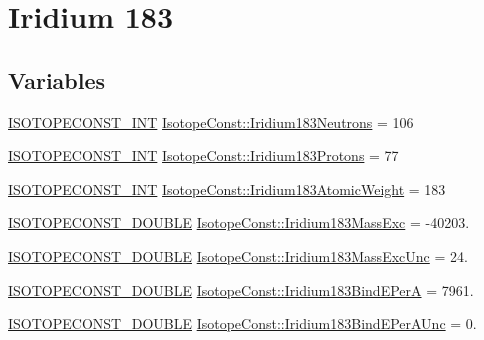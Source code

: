 \hypertarget{group___isotope_const-_iridium-_ir183}{}\section{Iridium 183}
\label{group___isotope_const-_iridium-_ir183}
\subsection*{Variables}
\begin{DoxyCompactItemize}
\item 
\mbox{\hyperlink{group___isotope_const-_macros_ga5f18360b3e99483a35c32d789e62621c}{I\+S\+O\+T\+O\+P\+E\+C\+O\+N\+S\+T\+\_\+\+I\+NT}} \mbox{\hyperlink{group___isotope_const-_iridium-_ir183_gadeab1f71143fd3c436f3b4bcf8632ced}{Isotope\+Const\+::\+Iridium183\+Neutrons}} = 106
\item 
\mbox{\hyperlink{group___isotope_const-_macros_ga5f18360b3e99483a35c32d789e62621c}{I\+S\+O\+T\+O\+P\+E\+C\+O\+N\+S\+T\+\_\+\+I\+NT}} \mbox{\hyperlink{group___isotope_const-_iridium-_ir183_gaadf6c00a1e99c0db1e58bdcf24077c23}{Isotope\+Const\+::\+Iridium183\+Protons}} = 77
\item 
\mbox{\hyperlink{group___isotope_const-_macros_ga5f18360b3e99483a35c32d789e62621c}{I\+S\+O\+T\+O\+P\+E\+C\+O\+N\+S\+T\+\_\+\+I\+NT}} \mbox{\hyperlink{group___isotope_const-_iridium-_ir183_gaf4d8ba202f96002aaa2a75c87951db82}{Isotope\+Const\+::\+Iridium183\+Atomic\+Weight}} = 183
\item 
\mbox{\hyperlink{group___isotope_const-_macros_ga8f45a7272ce02c0b4c65c44636ed719a}{I\+S\+O\+T\+O\+P\+E\+C\+O\+N\+S\+T\+\_\+\+D\+O\+U\+B\+LE}} \mbox{\hyperlink{group___isotope_const-_iridium-_ir183_gac775fbcd2e4a701e4ab6c0ac3c50a3a5}{Isotope\+Const\+::\+Iridium183\+Mass\+Exc}} = -\/40203.
\item 
\mbox{\hyperlink{group___isotope_const-_macros_ga8f45a7272ce02c0b4c65c44636ed719a}{I\+S\+O\+T\+O\+P\+E\+C\+O\+N\+S\+T\+\_\+\+D\+O\+U\+B\+LE}} \mbox{\hyperlink{group___isotope_const-_iridium-_ir183_gaf0f98b094ef2c2aa3fc425aa7f5fa321}{Isotope\+Const\+::\+Iridium183\+Mass\+Exc\+Unc}} = 24.
\item 
\mbox{\hyperlink{group___isotope_const-_macros_ga8f45a7272ce02c0b4c65c44636ed719a}{I\+S\+O\+T\+O\+P\+E\+C\+O\+N\+S\+T\+\_\+\+D\+O\+U\+B\+LE}} \mbox{\hyperlink{group___isotope_const-_iridium-_ir183_ga00c7ebe49bd0663fe80c99cf4325652e}{Isotope\+Const\+::\+Iridium183\+Bind\+E\+PerA}} = 7961.
\item 
\mbox{\hyperlink{group___isotope_const-_macros_ga8f45a7272ce02c0b4c65c44636ed719a}{I\+S\+O\+T\+O\+P\+E\+C\+O\+N\+S\+T\+\_\+\+D\+O\+U\+B\+LE}} \mbox{\hyperlink{group___isotope_const-_iridium-_ir183_ga9603cf63f5458b8b900a75184a3e44dc}{Isotope\+Const\+::\+Iridium183\+Bind\+E\+Per\+A\+Unc}} = 0.

\end{DoxyCompactItemize}
